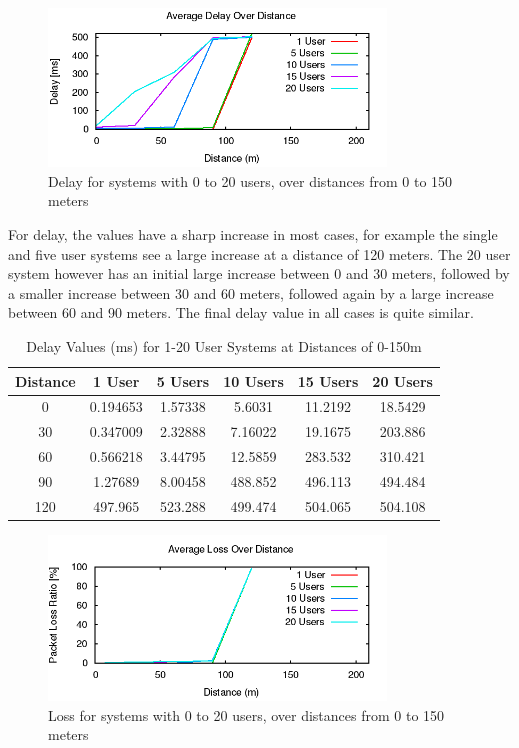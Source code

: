 \begin{figure}[H]
	\centering
	\includegraphics[width=0.8\textwidth]{images/EE500/QC/P3/Images/wifi-delay}
	\caption{Delay for systems with 0 to 20 users, over distances from 0 to
	150 meters}
	\label{fig:QCP3delay}
\end{figure}

For delay, the values have a sharp increase in most cases, for example the
single and five user systems see a large increase at a distance of 120 meters.
The 20 user system however has an initial large increase between 0 and 30
meters, followed by a smaller increase between 30 and 60 meters, followed again
by a large increase between 60 and 90 meters. The final delay value in all cases
is quite similar.

\begin{table}[H]
	\centering
	\caption{Delay Values (ms) for 1-20 User Systems at Distances of 0-150m}
	\label{tab:QCP3TPTable}
	\begin{tabular}{|c|c|c|c|c|c|}
		\hline
		Distance & 1 User & 5 Users & 10 Users & 15 Users & 20 Users\\
		\hline
		0 & 0.194653 & 1.57338 & 5.6031 & 11.2192 & 18.5429\\
		30 & 0.347009 & 2.32888 & 7.16022 & 19.1675 & 203.886\\
		60 & 0.566218 & 3.44795 & 12.5859 & 283.532 & 310.421\\
		90 & 1.27689 & 8.00458 & 488.852 & 496.113 & 494.484\\
		120 & 497.965 & 523.288 & 499.474 & 504.065 & 504.108\\
		\hline
	\end{tabular}
\end{table}

\begin{figure}[H]
	\centering
	\includegraphics[width=0.8\textwidth]{images/EE500/QC/P3/Images/wifi-loss}
	\caption{Loss for systems with 0 to 20 users, over distances from 0 to
	150 meters}
	\label{fig:QCP3loss}
\end{figure}

